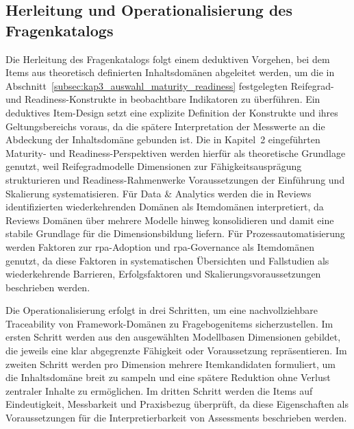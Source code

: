 \subsection{Herleitung und Operationalisierung des Fragenkatalogs}
\label{subsec:kap3_herleitung_fragenkatalog}

Die Herleitung des Fragenkatalogs folgt einem deduktiven Vorgehen, bei dem Items aus theoretisch definierten Inhaltsdomänen abgeleitet werden, um die in Abschnitt~\ref{subsec:kap3_auswahl_maturity_readiness} festgelegten Reifegrad- und Readiness-Konstrukte in beobachtbare Indikatoren zu überführen.\cite{Hinkin1998ScaleDevelopment,deBruin2005MainPhases,BeckerKnackstedtPoeppelbuss2009ProcedureModel}
Ein deduktives Item-Design setzt eine explizite Definition der Konstrukte und ihres Geltungsbereichs voraus, da die spätere Interpretation der Messwerte an die Abdeckung der Inhaltsdomäne gebunden ist.\cite{Hinkin1998ScaleDevelopment,Boateng2018ScaleDevelopment}
Die in Kapitel~2 eingeführten Maturity- und Readiness-Perspektiven werden hierfür als theoretische Grundlage genutzt, weil Reifegradmodelle Dimensionen zur Fähigkeitsausprägung strukturieren und Readiness-Rahmenwerke Voraussetzungen der Einführung und Skalierung systematisieren.\cite{PoeppeelbussRoeglinger2011DesignPrinciples,TornatzkyFleischer1990TOE,OliveiraMartins2011ITAdoptionReview}
Für Data \& Analytics werden die in Reviews identifizierten wiederkehrenden Domänen als Itemdomänen interpretiert, da Reviews Domänen über mehrere Modelle hinweg konsolidieren und damit eine stabile Grundlage für die Dimensionsbildung liefern.\cite{Langer2025DataAnalyticsMaturityReview,CardosoSu2022BIAMaturityModel}
Für Prozessautomatisierung werden Faktoren zur \gls{rpa}-Adoption und \gls{rpa}-Governance als Itemdomänen genutzt, da diese Faktoren in systematischen Übersichten und Fallstudien als wiederkehrende Barrieren, Erfolgsfaktoren und Skalierungsvoraussetzungen beschrieben werden.\cite{daSilvaCostaMamedeSilva2022RPAAdoptionSLR,KedzioraPenttinen2021RPAGovernance}

Die Operationalisierung erfolgt in drei Schritten, um eine nachvollziehbare Traceability von Framework-Domänen zu Fragebogenitems sicherzustellen.\cite{Hinkin1998ScaleDevelopment,Boateng2018ScaleDevelopment}
Im ersten Schritt werden aus den ausgewählten Modellbasen Dimensionen gebildet, die jeweils eine klar abgegrenzte Fähigkeit oder Voraussetzung repräsentieren.\cite{deBruin2005MainPhases,BeckerKnackstedtPoeppelbuss2009ProcedureModel}
Im zweiten Schritt werden pro Dimension mehrere Itemkandidaten formuliert, um die Inhaltsdomäne breit zu sampeln und eine spätere Reduktion ohne Verlust zentraler Inhalte zu ermöglichen.\cite{Hinkin1998ScaleDevelopment,Boateng2018ScaleDevelopment}
Im dritten Schritt werden die Items auf Eindeutigkeit, Messbarkeit und Praxisbezug überprüft, da diese Eigenschaften als Voraussetzungen für die Interpretierbarkeit von Assessments beschrieben werden.\cite{PoeppeelbussRoeglinger2011DesignPrinciples,Boateng2018ScaleDevelopment}

